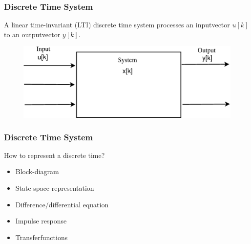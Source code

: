 \begin{frame}
	\frametitle{Discrete Time System}
	\begin{definition}
			A linear time-invariant (LTI) discrete time system processes an inputvector $u[k]$ to an outputvector $y[k]$.\\
	\end{definition}
		\begin{example}
			\begin{figure}
				\centering
				\includegraphics[width=0.7\linewidth]{Images/Discrete_time_eps_2.eps}
			\end{figure}
		\end{example}
\end{frame}
\begin{frame}
	\frametitle{Discrete Time System}
	\begin{block}{How to represent a discrete time?}
		\begin{itemize}
			\item Block-diagram
			\item State space representation
			\item Difference/differential equation
			\item Impulse response
			\item Transferfunctions
		\end{itemize}
	\end{block}
	

\end{frame}
